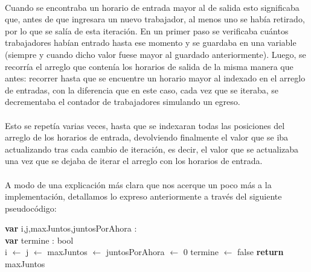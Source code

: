 \paragraph{}
Cuando se encontraba un horario de entrada mayor al de salida esto significaba que, antes de que ingresara un nuevo trabajador, al menos uno se hab\'ia retirado, por lo que se sal\'ia de esta iteraci\'on. En un primer paso se verificaba cu\'antos trabajadores habían entrado hasta ese momento y se guardaba en una variable (siempre y cuando dicho valor fuese mayor al guardado anteriormente). Luego, se recorr\'ia el arreglo que conten\'ia los horarios de salida de la misma manera que antes: recorrer hasta que se encuentre un horario mayor al indexado en el arreglo de entradas, con la diferencia que en este caso, cada vez que se iteraba, se decrementaba el contador de trabajadores simulando un egreso.

\paragraph{}
Esto se repet\'ia varias veces, hasta que se indexaran todas las posiciones del arreglo de los horarios de entrada, devolviendo finalmente el valor que se iba actualizando tras cada cambio de iteraci\'on, es decir, el valor que se actualizaba una vez que se dejaba de iterar el arreglo con los horarios de entrada.

\paragraph{}
A modo de una explicaci\'on m\'as clara que nos acerque un poco m\'as a la implementaci\'on, detallamos lo expreso anteriormente a trav\'es del siguiente pseudoc\'odigo:

\incmargin{1em}
\linesnumbered
{}


\begin{algorithm}[H]
\BlankLine
\textbf{var} i,j,maxJuntos,juntosPorAhora : \entero \\
\textbf{var} termine : bool \\
\BlankLine
i $\leftarrow$ j $\leftarrow$ maxJuntos $\leftarrow$ juntosPorAhora $\leftarrow$ 0
termine $\leftarrow$ false
\BlankLine
{}
\BlankLine
\textbf{return} maxJuntos
\end{algorithm}


